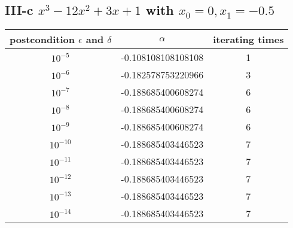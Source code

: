 \documentclass[twoside,a4paper]{article}
\begin{document}
\subsection*{III-c \small{$x^{3}-12x^2+3x+1$ with $x_0=0,x_1=-0.5$}}
\begin{tabular}{|c|c|c|}
\hline
postcondition   $\epsilon$  and  $\delta$  & $\alpha$  & iterating times\\
\hline
$10^{-5}$ & -0.108108108108108 & 1\\
\hline
$10^{-6}$ & -0.182578753220966 & 3\\
\hline
$10^{-7}$ & -0.188685400608274 & 6\\
\hline
$10^{-8}$ & -0.188685400608274 & 6\\
\hline
$10^{-9}$ & -0.188685400608274 & 6\\
\hline
$10^{-10}$ & -0.188685403446523 & 7\\
\hline
$10^{-11}$ & -0.188685403446523 & 7\\
\hline
$10^{-12}$ & -0.188685403446523 & 7\\
\hline
$10^{-13}$ & -0.188685403446523 & 7\\
\hline
$10^{-14}$ & -0.188685403446523 & 7\\
\hline
\end{tabular}
\end{document}
